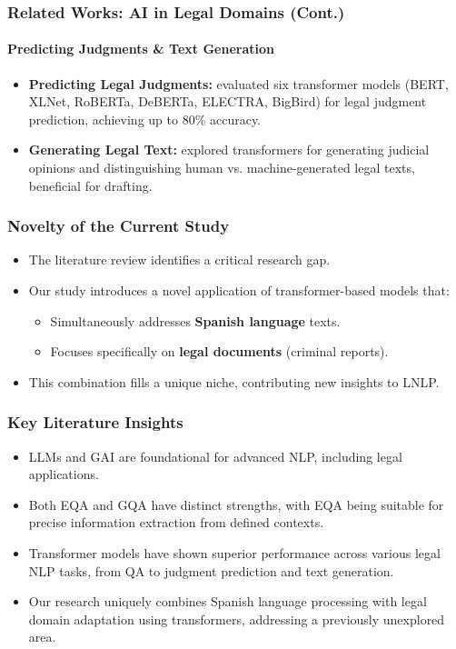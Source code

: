 \documentclass{beamer}
\begin{document}
\begin{frame}
    \frametitle{Related Works: AI in Legal Domains (Cont.)}
    \framesubtitle{Predicting Judgments \& Text Generation}
    \begin{itemize}
        \item \textbf{Predicting Legal Judgments:} \cite{Ghosh_Kumar_2024} evaluated six transformer models (BERT, XLNet, RoBERTa, DeBERTa, ELECTRA, BigBird) for legal judgment prediction, achieving up to 80\% accuracy.
        \item \textbf{Generating Legal Text:} \cite{Peric_Mijic_Stammbach_Ash_2020} explored transformers for generating judicial opinions and distinguishing human vs. machine-generated legal texts, beneficial for drafting.
    \end{itemize}
\end{frame}

\begin{frame}
    \frametitle{Novelty of the Current Study}
    \begin{itemize}
        \item The literature review identifies a critical research gap.
        \item Our study introduces a novel application of transformer-based models that:
        \begin{itemize}
            \item Simultaneously addresses \textbf{Spanish language} texts.
            \item Focuses specifically on \textbf{legal documents} (criminal reports).
        \end{itemize}
        \item This combination fills a unique niche, contributing new insights to \ac{LNLP}.
    \end{itemize}
\end{frame}

\begin{frame}
    \frametitle{Key Literature Insights}
    \begin{itemize}
        \item \ac{LLMs} and \ac{GAI} are foundational for advanced \ac{NLP}, including legal applications.
        \item Both \ac{EQA} and \ac{GQA} have distinct strengths, with \ac{EQA} being suitable for precise information extraction from defined contexts.
        \item Transformer models have shown superior performance across various legal \ac{NLP} tasks, from \ac{QA} to judgment prediction and text generation.
        \item Our research uniquely combines Spanish language processing with legal domain adaptation using transformers, addressing a previously unexplored area.
    \end{itemize}
  \end{frame}
\end{document}
